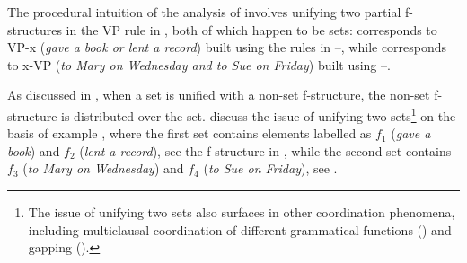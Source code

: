 \documentclass[output=paper]{../langscibook}
\begin{document}
\z
\ea\label{ex:max:man:96:43:VP-x:2}
\z
\ea\label{ex:max:man:96:43:x-VP:2}
\z
\ea\label{ex:max:man:96:43:x-VP}
\z
The procedural intuition of the analysis of 
involves unifying two partial f-structures in the VP rule in
, both of which happen to be sets:
 corresponds to
VP-x (\emph{gave a book or lent a record}) built using the rules in
–, while
 corresponds to x-VP (\emph{to Mary on
  Wednesday and to Sue on Friday}) built using
–.

As discussed in , when a set is
unified with a non-set f-structure, the non-set f-structure is
distributed over the set.  \citet{max:man:96} discuss the issue of
unifying two sets\footnote{The issue of unifying two sets also
  surfaces in other coordination phenomena, including multiclausal
  coordination of different grammatical functions
  () and gapping ().}  on
the basis of example , where the first set
contains elements labelled as $f_{1}$ (\emph{gave a book}) and $f_{2}$
(\emph{lent a record}), see the f-structure in
, while the second set contains $f_{3}$ (\emph{to
  Mary on Wednesday}) and $f_{4}$ (\emph{to Sue on Friday}), see
.
\end{document}
